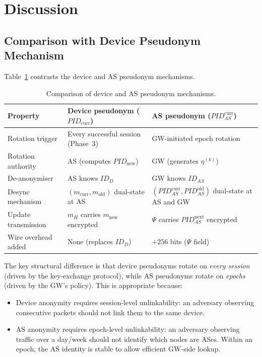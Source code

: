 \documentclass[12pt,a4paper]{article}
\newcommand{\IDd}{\mathit{ID}_D}
\newcommand{\IDas}{\mathit{ID}_{AS}}
\newcommand{\PIDcurr}{\mathit{PID}_{\mathrm{curr}}}
\newcommand{\PIDnew}{\mathit{PID}_{\mathrm{new}}}
\newcommand{\PIDas}{\mathit{PID}_{AS}}
\newcommand{\PIDascurr}{\mathit{PID}_{AS}^{\mathrm{curr}}}
\newcommand{\PIDASOld}{\mathit{PID}_{AS}^{\mathrm{old}}}
\newcommand{\mnew}{m_{\mathrm{new}}}
\begin{document}
\section{Discussion}

\subsection{Comparison with Device Pseudonym Mechanism}

Table~\ref{tab:comparison} contrasts the device and AS pseudonym
mechanisms.

\begin{table}[H]
\caption{Comparison of device and AS pseudonym mechanisms.}
\label{tab:comparison}
\centering
\renewcommand{\arraystretch}{1.3}
\begin{tabularx}{\textwidth}{@{}lXX@{}}
\toprule
\textbf{Property} & \textbf{Device pseudonym ($\PIDcurr$)} & \textbf{AS pseudonym ($\PIDascurr$)} \\
\midrule
Rotation trigger & Every successful session (Phase~3) & GW-initiated epoch rotation \\
Rotation authority & AS (computes $\PIDnew$) & GW (generates $\eta^{(k)}$) \\
De-anonymiser & AS knows $\IDd$ & GW knows $\IDas$ \\
Desync mechanism & $(m_{\mathrm{curr}}, m_{\mathrm{old}})$ dual-state at AS & $(\PIDascurr, \PIDASOld)$ dual-state at AS and GW \\
Update transmission & $m_H$ carries $\mnew$ encrypted & $\Psi$ carries $\PIDas^{\mathrm{next}}$ encrypted \\
Wire overhead added & None (replaces $\IDd$) & $+256$ bits ($\Psi$ field) \\
\bottomrule
\end{tabularx}
\end{table}

The key structural difference is that device pseudonyms rotate on
\emph{every session} (driven by the key-exchange protocol), while
AS pseudonyms rotate on \emph{epochs} (driven by the GW's policy).
This is appropriate because:
\begin{itemize}
  \item Device anonymity requires session-level unlinkability: an
        adversary observing consecutive packets should not link them
        to the same device.
  \item AS anonymity requires epoch-level unlinkability: an adversary
        observing traffic over a day/week should not identify which
        nodes are ASes.  Within an epoch, the AS identity is stable
        to allow efficient GW-side lookup.
\end{itemize}
\end{document}
